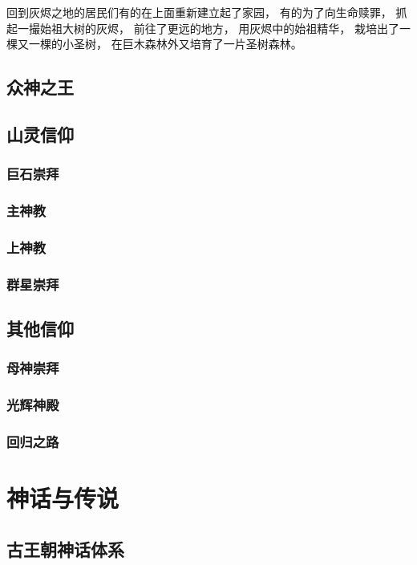 \documentclass[UTF8,12pt,draft]{ctexbook}
\begin{document}
                回到灰烬之地的居民们有的在上面重新建立起了家园，
                有的为了向生命赎罪，
                抓起一撮始祖大树的灰烬，
                前往了更远的地方，
                用灰烬中的始祖精华，
                栽培出了一棵又一棵的小圣树，
                在巨木森林外又培育了一片圣树森林。
            \subsection{众神之王}
            \subsection{山灵信仰}
                \subsubsection{巨石崇拜}
                \subsubsection{主神教}
                \subsubsection{上神教}
                \subsubsection{群星崇拜}
            \subsection{其他信仰}
                \subsubsection{母神崇拜}
                \subsubsection{光辉神殿}
                \subsubsection{回归之路}
        \section{神话与传说}
            \subsection{古王朝神话体系}
\end{document}
